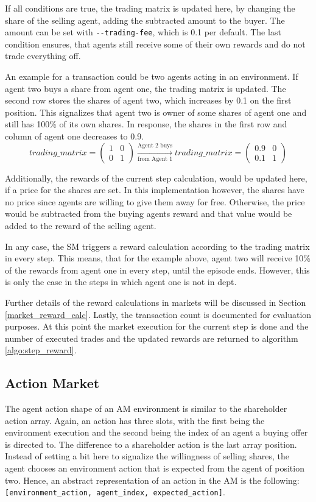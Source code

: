 If all conditions are true, the trading matrix is updated here, by changing the share of the selling agent, adding the subtracted amount to the buyer. The amount can be set with \verb|--trading-fee|, which is 0.1 per default. The last condition ensures, that agents still receive some of their own rewards and do not trade everything off. 

An example for a transaction could be two agents acting in an environment. If agent two buys a share from agent one, the trading matrix is updated. The second row stores the shares of agent two, which increases by 0.1 on the first position. This signalizes that agent two is owner of some shares of agent one and still has 100\% of its own shares. In response, the shares in the first row and column of agent one decreases to 0.9.
\begin{equation*}
trading\_matrix = 
\begin{pmatrix}
1 & 0 \\
0 & 1
\end{pmatrix} \xrightarrow[\text{from Agent 1}]{\text{Agent 2 buys}} 
trading\_matrix = 
\begin{pmatrix}
0.9 & 0 \\
0.1 & 1
\end{pmatrix} 
\end{equation*}

Additionally, the rewards of the current step calculation, would be updated here, if a price for the shares are set. In this implementation however, the shares have no price since agents are willing to give them away for free. Otherwise, the price would be subtracted from the buying agents reward and that value would be added to the reward of the selling agent. 

In any case, the SM triggers a reward calculation according to the trading matrix in every step. This means, that for the example above, agent two will receive 10\% of the rewards from agent one in every step, until the episode ends. However, this is only the case in the steps in which agent one is not in dept.

Further details of the reward calculations in markets will be discussed in Section \ref{market_reward_calc}. Lastly, the transaction count is documented for evaluation purposes. At this point the market execution for the current step is done and the number of executed trades and the updated rewards are returned to algorithm \ref{algo:step_reward}.

\subsection{Action Market}
The agent action shape of an AM environment is similar to the shareholder action array. Again, an action has three slots, with the first being the environment execution and the second being the index of an agent a buying offer is directed to. The difference to a shareholder action is the last array position. Instead of setting a bit here to signalize the willingness of selling shares, the agent chooses an environment action that is expected from the agent of position two. Hence, an abstract representation of an action in the AM is the following: \verb|[environment_action, agent_index, expected_action]|.

